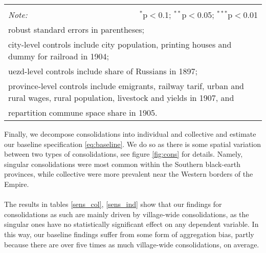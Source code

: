 \documentclass[a4paper, 12pt]{article}
\begin{document}
\begin{table}[!htbp]
{\begin{tabular}{@{\extracolsep{5pt}}lcccccc}
\hline 
\hline \\[-1.8ex] 
\textit{Note:}  & \multicolumn{6}{r}{$^{*}$p$<$0.1; $^{**}$p$<$0.05; $^{***}$p$<$0.01} \\ 
\multicolumn{7}{l}{robust standard errors in parentheses;} \\
\multicolumn{7}{l}{city-level controls include city population, printing houses and dummy for railroad in 1904;} \\
\multicolumn{7}{l}{uezd-level controls include share of Russians in 1897;}\\
\multicolumn{7}{l}{province-level controls include emigrants, railway tarif, urban and rural wages, rural population, livestock and yields in 1907, and }\\
\multicolumn{7}{l}{repartition commune space share in 1905.}
\end{tabular} 
}
\end{table} 

\noindent Finally, we decompose consolidations into individual and collective and estimate our baseline specification \eqref{eq:baseline}. We do so as  there is some spatial variation between two types of consolidations, see figure \ref{fig:cons} for details. Namely, singular consolidations were most common within the Southern black-earth provinces, while collective were more prevalent near the Western borders of the Empire.
\\\\
\noindent The results in tables \ref{sens_col}, \ref{sens_ind} show that our findings for consolidations as such are mainly driven by village-wide consolidations, as the singular ones have no statistically significant effect on any dependent variable. In this way, our baseline findings suffer from some form of aggregation bias, partly because there are over five times as much village-wide consolidations, on average.
\end{document}
